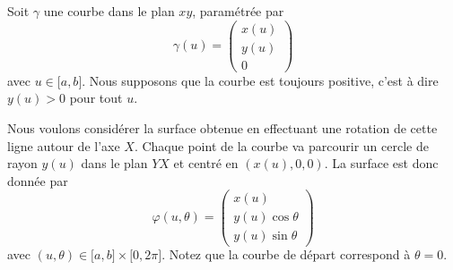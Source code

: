 Soit $\gamma$ une courbe dans le plan $xy$, paramétrée par
\begin{equation}
    \gamma(u)=\begin{pmatrix}
        x(u)    \\ 
        y(u)    \\ 
        0    
    \end{pmatrix}
\end{equation}
avec $u\in\mathopen[ a , b \mathclose]$. Nous supposons que la courbe est toujours positive, c'est à dire $y(u)>0$ pour tout $u$.

Nous voulons considérer la surface obtenue en effectuant une rotation de cette ligne autour de l'axe $X$. Chaque point de la courbe va parcourir un cercle de rayon $y(u)$ dans le plan $YX$ et centré en $(x(u),0,0)$. La surface est donc donnée par
\begin{equation}
    \varphi(u,\theta)=\begin{pmatrix}
        x(u)    \\ 
        y(u)\cos\theta    \\ 
        y(u)\sin\theta    
    \end{pmatrix}
\end{equation}
avec $(u,\theta)\in\mathopen[ a , b \mathclose]\times \mathopen[ 0 , 2\pi \mathclose]$. Notez que la courbe de départ correspond à $\theta=0$.

